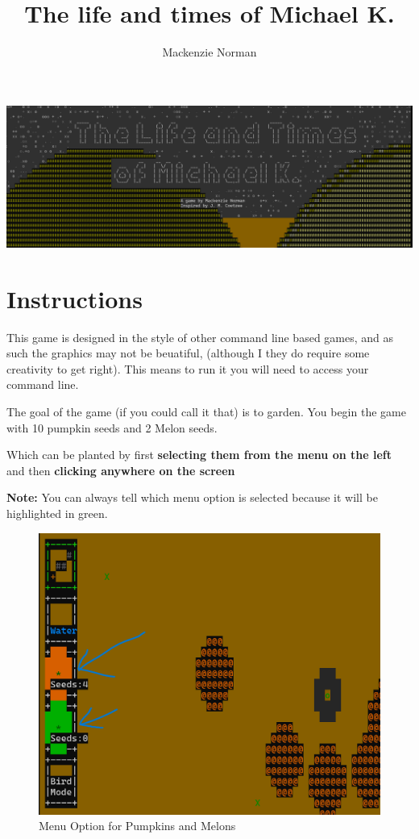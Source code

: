 \documentclass{article}
\title{The life and times of Michael K.}
\author{Mackenzie Norman}
\begin{document}
\maketitle
\begin{center}
    \includegraphics[width=\textwidth]{title_screen.png}
\end{center}
\section*{Instructions}
This game is designed in the style of other command line based games, and as such the graphics may not be beuatiful, (although I they do require some creativity to get right). This means to run it you will need to access your command line.

The goal of the game (if you could call it that) is to garden. You begin the game with 10 pumpkin seeds and 2 Melon seeds.

Which can be planted by first \textbf{selecting them from the menu on the left} and then \textbf{clicking anywhere on the screen}

\textbf{Note:} You can always tell which menu option is selected because it will be highlighted in green.

    \begin{figure}[H]
    \includegraphics[width=\textwidth]{melons-pumpkins.png}
    \caption{Menu Option for Pumpkins and Melons}
        
    \end{figure}
\end{document}
